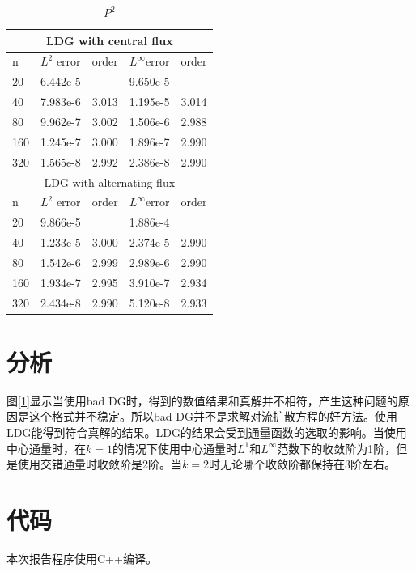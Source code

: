 \documentclass[12pt, a4paper]{ctexart}
\begin{document}
	\begin{table}[htbp]
		\centering
		\caption{$P^2$}
		\label{3}
		\begin{tabular}{| p{50pt}<{\centering} | p{60pt}<{\centering} | p{60pt}<{\centering} || p{60pt}<{\centering} | p{60pt}<{\centering}|}
			\hline
			\multicolumn{5}{|c|}{LDG with central flux} \\
			\hline
			n & $L^2$ error & order & $L^\infty$error & order \\
			\hline
			20 & 6.442e-5 &  & 9.650e-5 &  \\
			\hline
			40 & 7.983e-6 & 3.013 & 1.195e-5 & 3.014\\
			\hline
			80 & 9.962e-7 & 3.002 & 1.506e-6 & 2.988\\
			\hline
			160 & 1.245e-7 & 3.000 & 1.896e-7 & 2.990\\
			\hline
			320 & 1.565e-8 & 2.992 & 2.386e-8 & 2.990\\
			\hline
			\multicolumn{5}{|c|}{LDG with alternating flux} \\
			\hline
			n & $L^2$ error & order & $L^\infty$error & order \\
			\hline
			20 & 9.866e-5 &  & 1.886e-4 &  \\
			\hline
			40 & 1.233e-5 & 3.000 & 2.374e-5 & 2.990\\
			\hline
			80 & 1.542e-6 & 2.999 & 2.989e-6 & 2.990\\
			\hline
			160 & 1.934e-7 & 2.995 & 3.910e-7 & 2.934\\
			\hline
			320 & 2.434e-8 & 2.990 & 5.120e-8 & 2.933\\
			\hline
		\end{tabular}
	\end{table}

	\newpage
	\section{分析}
	
	图\ref{1}显示当使用bad DG时，得到的数值结果和真解并不相符，产生这种问题的原因是这个格式并不稳定。所以bad DG并不是求解对流扩散方程的好方法。使用LDG能得到符合真解的结果。LDG的结果会受到通量函数的选取的影响。当使用中心通量时，在$k=1$的情况下使用中心通量时$L^1$和$L^\infty$范数下的收敛阶为1阶，但是使用交错通量时收敛阶是2阶。当$k=2$时无论哪个收敛阶都保持在3阶左右。
	
	\section{代码}
	本次报告程序使用C++编译。
	
\end{document}
